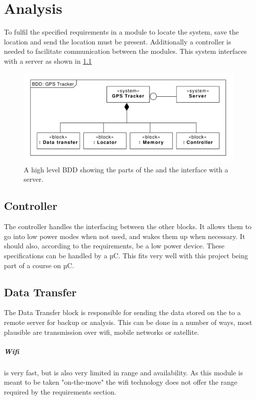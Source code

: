 
\chapter{Analysis}
\label{chap:analysis}
To fulfil the specified requirements in  a module to locate the system, save the location and send the location must be present.
Additionally a controller is needed to facilitate communication between the modules.
This system interfaces with a server as shown in \cref{fig:BDD:unspecified}

\begin{figure}[H]
	\centering
	\includegraphics[width=0.7\linewidth]{gfx/Design/BDD_Unspecified.pdf}
	\caption{A high level BDD showing the parts of the \systemName and the interface with a server.}
	\label{fig:BDD:unspecified}
\end{figure}

\section{Controller}
The controller handles the interfacing between the other blocks.
It allows them to go into low power modes when not used, and wakes them up when necessary.
It should also, according to the requirements, be a low power device.
These specifications can be handled by a µC.
This fits very well with this project being part of a course on µC.

\section{Data Transfer}
The Data Transfer block is responsible for sending the data stored on the \systemName to a remote server for backup or analysis.
This can be done in a number of ways, most plausible are transmission over wifi, mobile networks or satellite.
\paragraph{Wifi} is very fast, but is also very limited in range and availability.
As this module is meant to be taken "on-the-move" the wifi technology does not offer the range required by the requirements section.
